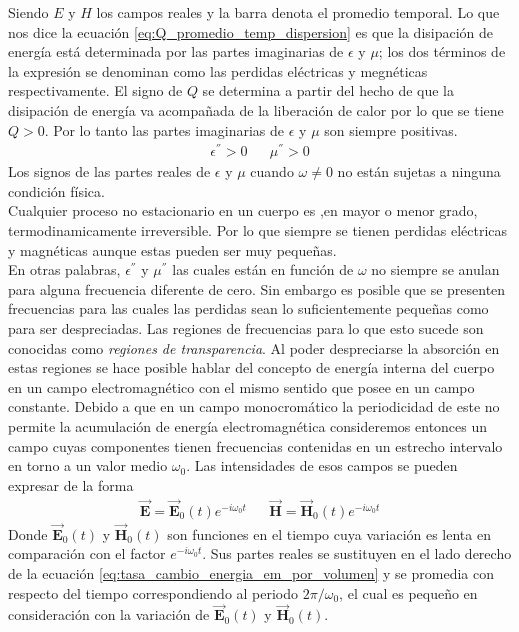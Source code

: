 \documentclass[../tesis_main_file.tex]{subfiles}
\begin{document}
Siendo $E$ y $H$ los campos reales y la barra denota el promedio temporal.
Lo que nos dice la ecuación \ref{eq:Q_promedio_temp_dispersion} es que la disipación de energía está determinada por las partes imaginarias de $\epsilon$ y  $\mu$; los dos términos de la expresión se denominan como las perdidas eléctricas y megnéticas respectivamente. El signo de $Q$ se determina a partir del hecho de que la disipación de energía va acompañada de la liberación de calor por lo que se tiene $Q>0$. Por lo tanto las partes imaginarias de $\epsilon$ y $\mu$ son siempre positivas.
\begin{align}
\epsilon^{''} > 0 & &\mu^{''} > 0
\end{align}
Los signos de las partes reales de $\epsilon$ y $\mu$ cuando $\omega\neq0$ no están sujetas a ninguna condición física.\\
Cualquier proceso no estacionario en un cuerpo es ,en mayor o menor grado, termodinamicamente irreversible. Por lo que siempre se tienen perdidas eléctricas y magnéticas aunque estas pueden ser muy pequeñas.\\
En otras palabras, $\epsilon ^{''}$ y $\mu ^{''}$ las cuales están en función de $\omega$ no siempre se anulan para alguna frecuencia diferente de cero. Sin embargo es posible que se presenten frecuencias para las cuales las perdidas sean lo suficientemente pequeñas como para ser despreciadas. Las regiones de frecuencias para lo que esto sucede son conocidas como \textit{regiones de transparencia}\cite{Landau1690Electro_media}. Al poder despreciarse la absorción en estas regiones se hace posible hablar del concepto de energía interna del cuerpo en un campo electromagnético con el mismo sentido que posee en un campo constante. Debido a que en un campo monocromático la periodicidad de este no permite la acumulación de energía electromagnética consideremos entonces un campo cuyas componentes tienen frecuencias contenidas en un estrecho intervalo en torno a un valor medio $\omega_0$. Las intensidades de esos campos se pueden expresar de la forma
\begin{align}
\label{eq:campos_no_monocromaticos}
\overrightarrow{\textbf{E}} = \overrightarrow{\textbf{E}}_0(t)e^{-i\omega_0 t} & &\overrightarrow{\textbf{H}} = \overrightarrow{\textbf{H}}_0(t)e^{-i\omega_0 t}
\end{align}
Donde $\overrightarrow{\textbf{E}}_0(t)$ y $\overrightarrow{\textbf{H}}_0(t)$ son funciones en el tiempo cuya variación es lenta en comparación con el factor $e^{-i\omega_0 t}$. Sus partes reales se sustituyen en el lado derecho de la ecuación \ref{eq:tasa_cambio_energia_em_por_volumen} y se promedia con respecto del tiempo correspondiendo al periodo $2\pi / \omega_0$, el cual es pequeño en consideración con la variación de $\overrightarrow{\textbf{E}}_0(t)$ y $\overrightarrow{\textbf{H}}_0(t)$.\\
\end{document}
